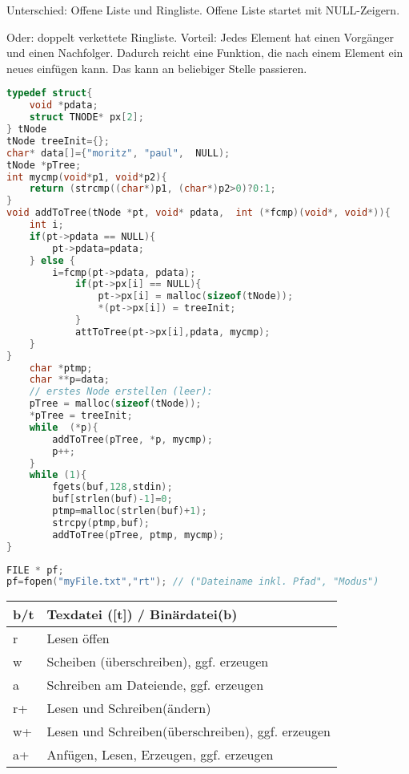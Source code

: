 \begin{multicols}{3}
Unterschied: Offene Liste und Ringliste. Offene Liste startet mit NULL-Zeigern.

Oder: doppelt verkettete Ringliste. Vorteil: Jedes Element hat einen Vorgänger und einen Nachfolger. Dadurch reicht eine Funktion, die nach einem Element ein neues einfügen kann. Das kann an beliebiger Stelle passieren.

\begin{lstlisting}[language=C]
typedef struct{
	void *pdata;
	struct TNODE* px[2];
} tNode
tNode treeInit={};
char* data[]={"moritz", "paul",  NULL);
tNode *pTree;
int mycmp(void*p1, void*p2){
	return (strcmp((char*)p1, (char*)p2>0)?0:1;
}
void addToTree(tNode *pt, void* pdata,  int (*fcmp)(void*, void*)){
	int i;
	if(pt->pdata == NULL){
		pt->pdata=pdata;
	} else {
		i=fcmp(pt->pdata, pdata);
			if(pt->px[i] == NULL){
				pt->px[i] = malloc(sizeof(tNode));
				*(pt->px[i]) = treeInit;
			}
			attToTree(pt->px[i],pdata, mycmp);
	}
}
	char *ptmp;
	char **p=data;
	// erstes Node erstellen (leer):
	pTree = malloc(sizeof(tNode));
	*pTree = treeInit;
	while  (*p){
		addToTree(pTree, *p, mycmp); 
		p++;
	}
	while (1){
		fgets(buf,128,stdin);
		buf[strlen(buf)-1]=0;
		ptmp=malloc(strlen(buf)+1);
		strcpy(ptmp,buf);
		addToTree(pTree, ptmp, mycmp);
}
\end{lstlisting}

\HRule[4pt]
\begin{lstlisting}[language=C]
FILE * pf;
pf=fopen("myFile.txt","rt"); // ("Dateiname inkl. Pfad", "Modus")
\end{lstlisting}
\begin{tabular}{l | l}
b/t& Texdatei ([t]) / Binärdatei(b)\\
\hline 
r&Lesen öffen\\
w&Scheiben (überschreiben), ggf. erzeugen\\
a&Schreiben am Dateiende, ggf. erzeugen\\
r+&Lesen und Schreiben(ändern)\\
w+&Lesen und Schreiben(überschreiben), ggf. erzeugen\\
a+&Anfügen, Lesen, Erzeugen, ggf. erzeugen\\
\end{tabular}



\end{multicols}
